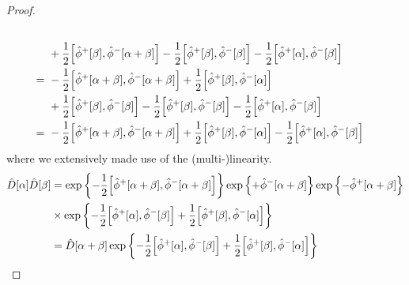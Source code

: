 \begin{proof}
\begin{equation*}
\begin{split}
			\\
			&\
			+
			\frac{1}{2}
			\comm{\hat\phi^+[\beta]}{\hat\phi^-[\alpha+\beta]}
			-
			\frac{1}{2}
			\comm{\hat\phi^+[\beta]}{\hat\phi^-[\beta]}
			-
			\frac{1}{2}
			\comm{\hat\phi^+[\alpha]}{\hat\phi^-[\beta]}
			\\
			=&\
			-
			\frac{1}{2}
			\comm{\hat\phi^+[\alpha+\beta]}{\hat\phi^-[\alpha+\beta]}
			+
			\frac{1}{2}
			\comm{\hat\phi^+[\beta]}{\hat\phi^-[\alpha]}
			\\
			&\
			+
			\frac{1}{2}
			\comm{\hat\phi^+[\beta]}{\hat\phi^-[\beta]}
			-
			\frac{1}{2}
			\comm{\hat\phi^+[\beta]}{\hat\phi^-[\beta]}
			-
			\frac{1}{2}
			\comm{\hat\phi^+[\alpha]}{\hat\phi^-[\beta]}
			\\
			=&\
			-
			\frac{1}{2}
			\comm{\hat\phi^+[\alpha+\beta]}{\hat\phi^-[\alpha+\beta]}
			+
			\frac{1}{2}
			\comm{\hat\phi^+[\beta]}{\hat\phi^-[\alpha]}
			-
			\frac{1}{2}
			\comm{\hat\phi^+[\alpha]}{\hat\phi^-[\beta]}
		\end{split}
	\end{equation*}
	where we extensively made use of the (multi-)linearity.
	\begin{equation*}
		\begin{split}
			\hat{D}[\alpha]
			\hat{D}[\beta]
			&=
			\exp\left\{
				-
				\frac{1}{2}
				\comm{\hat\phi^+[\alpha+\beta]}{\hat\phi^-[\alpha+\beta]}
			\right\}
			\exp\left\{
				+
				\hat\phi^-[\alpha+\beta]
			\right\}
			\exp\left\{
				-
				\hat\phi^+[\alpha+\beta]
			\right\}
			\\
			&\times
			\exp\left\{
				-
				\frac{1}{2}
				\comm{\hat\phi^+[\alpha]}{\hat\phi^-[\beta]}
				+
				\frac{1}{2}
				\comm{\hat\phi^+[\beta]}{\hat\phi^-[\alpha]}
			\right\}
			\\
			&=
			\hat{D}[\alpha+\beta]
			\exp\left\{
				-
				\frac{1}{2}
				\comm{\hat\phi^+[\alpha]}{\hat\phi^-[\beta]}
				+
				\frac{1}{2}
				\comm{\hat\phi^+[\beta]}{\hat\phi^-[\alpha]}
			\right\}
		\end{split}
	\end{equation*}
\end{proof}

